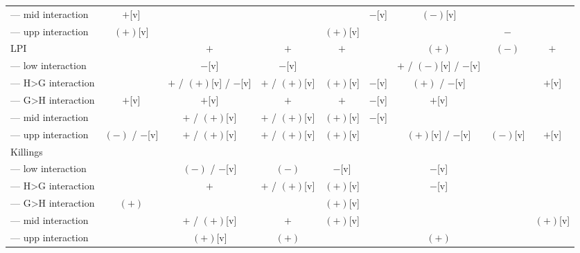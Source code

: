 \begin{landscape}
\begin{table}[!htbp]
\begin{tabular}{lcccccccc}
--- mid interaction & $+$[v]         &                         &                &          & $-$[v] & $(-)$[v]                &               & \\
--- upp interaction & $(+)$[v]       &                         &                & $(+)$[v] &        &                         & $-$           & \\
LPI                 &                & $+$                     & $+$            & $+$      &        & $(+)$                   & $(-)$         & $+$ \\
--- low interaction &                & $-$[v]                  & $-$[v]         &          &        & $+$ / $(-)$[v] / $-$[v] &               & \\
--- H>G interaction &                & $+$ / $(+)$[v] / $-$[v] & $+$ / $(+)$[v] & $(+)$[v] & $-$[v] & $(+)$ / $-$[v]          &               & $+$[v] \\
--- G>H interaction & $+$[v]         & $+$[v]                  & $+$            & $+$      & $-$[v] & $+$[v]                  &               & \\
--- mid interaction &                & $+$ / $(+)$[v]          & $+$ / $(+)$[v] & $(+)$[v] & $-$[v] &                         &               & \\
--- upp interaction & $(-)$ / $-$[v] & $+$ / $(+)$[v]          & $+$ / $(+)$[v] & $(+)$[v] &        & $(+)$[v] / $-$[v]       & $(-)$[v]      & $+$[v] \\
Killings            &                &                         &                &          &        &                         &               & \\
--- low interaction &                & $(-)$ / $-$[v]          & $(-)$          & $-$[v]   &        & $-$[v]                  &               & \\
--- H>G interaction &                & $+$                     & $+$ / $(+)$[v] & $(+)$[v] &        & $-$[v]                  &               & \\
--- G>H interaction & $(+)$          &                         &                & $(+)$[v] &        &                         &               & \\
--- mid interaction &                & $+$ / $(+)$[v]          & $+$            & $(+)$[v] &        &                         &               & $(+)$[v] \\
--- upp interaction &                & $(+)$[v]                & $(+)$          &          &        & $(+)$                   &               & \\
\bottomrule
\end{tabular}
\end{table}
\end{landscape}
